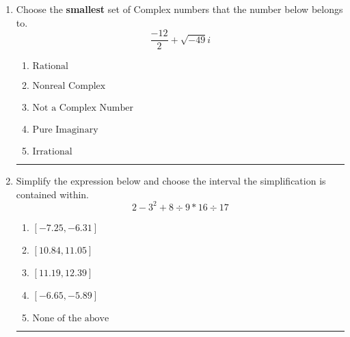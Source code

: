 \documentclass[14pt]{extbook}
\newcommand{\litem}[1]{\item#1\hspace*{-1cm}\rule{\textwidth}{0.4pt}}
\begin{document}
\begin{enumerate}
{\begin{enumerate}[label=\Alph*.]
\end{enumerate} }
\litem{
Choose the \textbf{smallest} set of Complex numbers that the number below belongs to.\[ \frac{-12}{2}+\sqrt{-49}i \]\begin{enumerate}[label=\Alph*.]
\item \( \text{Rational} \)
\item \( \text{Nonreal Complex} \)
\item \( \text{Not a Complex Number} \)
\item \( \text{Pure Imaginary} \)
\item \( \text{Irrational} \)

\end{enumerate} }
\litem{
Simplify the expression below and choose the interval the simplification is contained within.\[ 2 - 3^2 + 8 \div 9 * 16 \div 17 \]\begin{enumerate}[label=\Alph*.]
\item \( [-7.25, -6.31] \)
\item \( [10.84, 11.05] \)
\item \( [11.19, 12.39] \)
\item \( [-6.65, -5.89] \)
\item \( \text{None of the above} \)

\end{enumerate} }
\end{enumerate}
\end{document}
